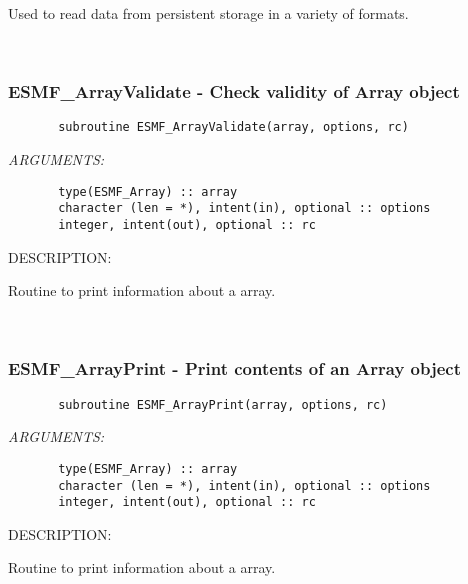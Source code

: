    Used to read data from persistent storage in a variety of formats.
  
   
 
\mbox{}\hrulefill\ 
 
\subsubsection [ESMF\_ArrayValidate] {ESMF\_ArrayValidate - Check validity of Array object}


  
\begin{verbatim}       subroutine ESMF_ArrayValidate(array, options, rc)\end{verbatim}{\em ARGUMENTS:}
\begin{verbatim}       type(ESMF_Array) :: array
       character (len = *), intent(in), optional :: options
       integer, intent(out), optional :: rc\end{verbatim}
{\sf DESCRIPTION:\\ }


   Routine to print information about a array.
   
 
\mbox{}\hrulefill\ 
 
\subsubsection [ESMF\_ArrayPrint] {ESMF\_ArrayPrint - Print contents of an Array object}


  
\begin{verbatim}       subroutine ESMF_ArrayPrint(array, options, rc)\end{verbatim}{\em ARGUMENTS:}
\begin{verbatim}       type(ESMF_Array) :: array
       character (len = *), intent(in), optional :: options
       integer, intent(out), optional :: rc\end{verbatim}
{\sf DESCRIPTION:\\ }


   Routine to print information about a array.
  
